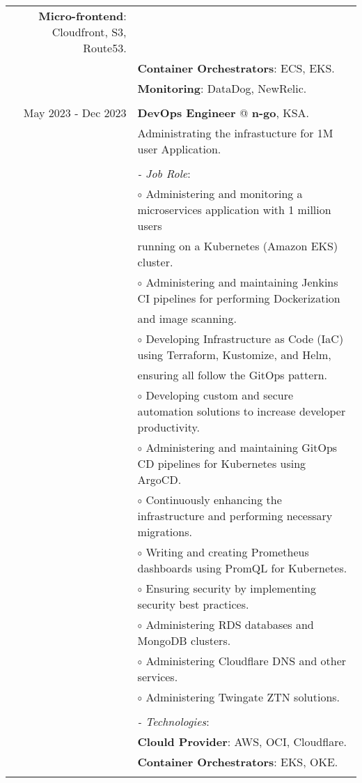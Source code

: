 \documentclass[a4paper,10pt]{article}
\begin{document}
\begin{longtable}{r|l}
    \textbf{Micro-frontend}: Cloudfront, S3, Route53. \\&
    \textbf{Container Orchestrators}: ECS, EKS. \\&
    \textbf{Monitoring}: DataDog, NewRelic. \\&
    \\
    May 2023 - Dec 2023 & \textbf{DevOps Engineer} @
    \textbf{n-go}, KSA. \\&
    Administrating the infrastucture for 1M user Application. \\&
    \\&
    \textit{- Job Role}:\\&
    $\circ$ Administering and monitoring a microservices application with 1 million users \\ & 
    running on a Kubernetes (Amazon EKS) cluster. \\ &
    $\circ$ Administering and maintaining Jenkins CI pipelines for performing Dockerization \\ &
    and image scanning. \\ &
    $\circ$ Developing Infrastructure as Code (IaC) using Terraform, Kustomize, and Helm, \\ & 
    ensuring all follow the GitOps pattern. \\ &
    $\circ$ Developing custom and secure automation solutions to increase developer productivity. \\ &
    $\circ$ Administering and maintaining GitOps CD pipelines for Kubernetes using ArgoCD. \\ &
    $\circ$ Continuously enhancing the infrastructure and performing necessary migrations. \\ &
    $\circ$ Writing and creating Prometheus dashboards using PromQL for Kubernetes. \\ &
    $\circ$ Ensuring security by implementing security best practices. \\ &
    $\circ$ Administering RDS databases and MongoDB clusters. \\ &
    $\circ$ Administering Cloudflare DNS and other services. \\ &
    $\circ$ Administering Twingate ZTN solutions. \\ &
    \\&
    \textit{- Technologies}:\\&
    \textbf{Clould Provider}: AWS, OCI, Cloudflare. \\&
    \textbf{Container Orchestrators}: EKS, OKE. \\&

\end{longtable}
\end{document}
